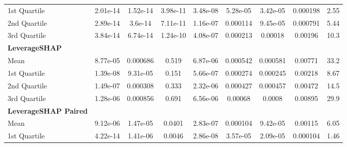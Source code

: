 {\begin{tabular} {lcccccccc}
\hspace{7pt}1st Quartile & \cellcolor{silver!60}2.01e-14 & \cellcolor{gold!60}1.52e-14 & \cellcolor{gold!60}3.98e-11 & 3.48e-08 & \cellcolor{bronze!60}5.28e-05 & 3.42e-05 & 0.000198 & \cellcolor{bronze!60}2.55 \\ 
\hspace{7pt}2nd Quartile & \cellcolor{gold!60}2.89e-14 & \cellcolor{gold!60}3.6e-14 & \cellcolor{gold!60}7.11e-11 & \cellcolor{silver!60}1.16e-07 & \cellcolor{bronze!60}0.000114 & \cellcolor{bronze!60}9.45e-05 & 0.000791 & \cellcolor{bronze!60}5.44 \\ 
\hspace{7pt}3rd Quartile & \cellcolor{silver!60}3.84e-14 & \cellcolor{gold!60}6.74e-14 & \cellcolor{silver!60}1.24e-10 & \cellcolor{bronze!60}4.08e-07 & \cellcolor{bronze!60}0.000213 & \cellcolor{bronze!60}0.00018 & \cellcolor{bronze!60}0.00196 & \cellcolor{bronze!60}10.3 \\ 
\addlinespace[1ex] 
\textbf{LeverageSHAP} &  &  &  &  &  &  &  &  \\ 
\hspace{7pt}Mean & 8.77e-05 & 0.000686 & 0.519 & 6.87e-06 & 0.000542 & 0.000581 & 0.00771 & 33.2 \\ 
\hspace{7pt}1st Quartile & 1.39e-08 & 9.31e-05 & 0.151 & 5.66e-07 & 0.000274 & 0.000245 & 0.00218 & 8.67 \\ 
\hspace{7pt}2nd Quartile & 1.49e-07 & 0.000308 & 0.333 & 2.32e-06 & 0.000427 & 0.000457 & 0.00472 & 14.5 \\ 
\hspace{7pt}3rd Quartile & 1.28e-06 & 0.000856 & 0.691 & 6.56e-06 & 0.00068 & 0.0008 & 0.00895 & 29.9 \\ 
\addlinespace[1ex] 
\textbf{LeverageSHAP Paired} &  &  &  &  &  &  &  &  \\ 
\hspace{7pt}Mean & 9.12e-06 & \cellcolor{bronze!60}1.47e-05 & \cellcolor{bronze!60}0.0401 & \cellcolor{silver!60}2.83e-07 & \cellcolor{silver!60}0.000104 & \cellcolor{silver!60}9.42e-05 & \cellcolor{gold!60}0.00115 & \cellcolor{gold!60}6.05 \\ 
\hspace{7pt}1st Quartile & 4.22e-14 & \cellcolor{bronze!60}1.41e-06 & \cellcolor{bronze!60}0.0046 & \cellcolor{silver!60}2.86e-08 & \cellcolor{silver!60}3.57e-05 & \cellcolor{silver!60}2.09e-05 & \cellcolor{gold!60}0.000104 & \cellcolor{gold!60}1.46 \\ 

\end{tabular}}
